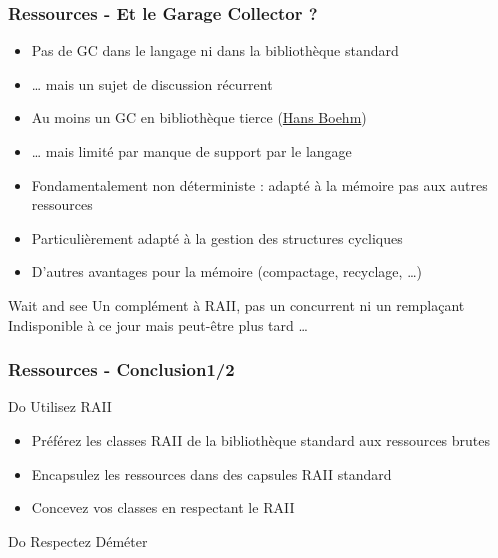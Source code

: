 \documentclass[C++.tex]{subfiles}
\begin{document}
\begin{frame}
	\frametitle{Ressources - Et le Garage Collector ?}
	\begin{itemize}
		\item Pas de GC dans le langage ni dans la bibliothèque standard
		\item \ldots{} mais un sujet de discussion récurrent


		\item Au moins un GC en bibliothèque tierce (\href{http://www.hboehm.info/gc/}{Hans Boehm})
		\item \ldots{} mais limité par manque de support par le langage


		\item Fondamentalement non déterministe : adapté à la mémoire pas aux autres ressources


		\item Particulièrement adapté à la gestion des structures cycliques


		\item D'autres avantages pour la mémoire (compactage, recyclage, \ldots)
	\end{itemize}

	\begin{block}{Wait and see}
		Un complément à RAII, pas un concurrent ni un remplaçant\\
		Indisponible à ce jour mais peut-être plus tard \ldots
	\end{block}
\end{frame}

\begin{frame}
	\frametitle{Ressources - Conclusion\titlehfill{}1/2}
	\begin{exampleblock}{Do}
		Utilisez RAII
		\begin{itemize}
			\item Préférez les classes RAII de la bibliothèque standard aux ressources brutes
			\item Encapsulez les ressources dans des capsules RAII standard
			\item Concevez vos classes en respectant le RAII
		\end{itemize}
	\end{exampleblock}

	\begin{exampleblock}{Do}
		Respectez Déméter
	\end{exampleblock}
\end{frame}
\end{document}
